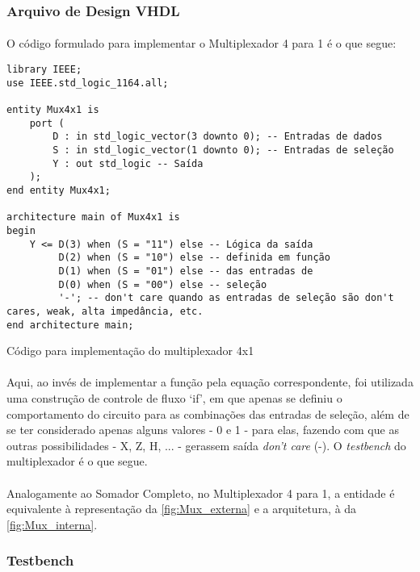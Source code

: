 \documentclass[a4paper,12pt]{article}
\newenvironment{code}{\captionsetup{type=listing}}{}
\begin{document}
\subsubsection{Arquivo de Design VHDL}
\paragraph{}
O código formulado para implementar o Multiplexador 4 para 1 é o que segue:

\begin{code}
\begin{verbatim}
library IEEE;
use IEEE.std_logic_1164.all;

entity Mux4x1 is
    port (
        D : in std_logic_vector(3 downto 0); -- Entradas de dados
        S : in std_logic_vector(1 downto 0); -- Entradas de seleção
        Y : out std_logic -- Saída
    );
end entity Mux4x1;

architecture main of Mux4x1 is
begin
    Y <= D(3) when (S = "11") else -- Lógica da saída
         D(2) when (S = "10") else -- definida em função
         D(1) when (S = "01") else -- das entradas de
         D(0) when (S = "00") else -- seleção
         '-'; -- don't care quando as entradas de seleção são don't cares, weak, alta impedância, etc.
end architecture main;
\end{verbatim}
\caption{Código para implementação do multiplexador 4x1}
\end{code}

\paragraph{}
Aqui, ao invés de implementar a função pela equação correspondente, foi utilizada uma construção de controle de fluxo `if', em que apenas se definiu o comportamento do circuito para as combinações das entradas de seleção, além de se ter considerado apenas alguns valores - 0 e 1 - para elas, fazendo com que as outras possibilidades - X, Z, H, ... - gerassem saída \textit{don't care} (-). O \textit{testbench} do multiplexador é o que segue.

\paragraph{}
Analogamente ao Somador Completo, no Multiplexador 4 para 1, a entidade é equivalente à representação da \autoref{fig:Mux_externa} e a arquitetura, à da \autoref{fig:Mux_interna}.

\subsubsection{Testbench}
\end{document}

